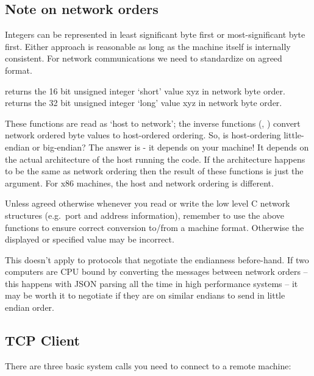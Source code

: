 \subsection{Note on network orders}

Integers can be represented in least significant byte first or most-significant byte first.
Either approach is reasonable as long as the machine itself is internally consistent.
For network communications we need to standardize on agreed format.

 returns the 16 bit unsigned integer `short' value xyz in network byte order.
 returns the 32 bit unsigned integer `long' value xyz in network byte order.

These functions are read as `host to network'; the inverse functions (, ) convert network ordered byte values to host-ordered ordering.
So, is host-ordering little-endian or big-endian? The answer is - it depends on your machine! It depends on the actual architecture of the host running the code.
If the architecture happens to be the same as network ordering then the result of these functions is just the argument.
For x86 machines, the host and network ordering is different.

Unless agreed otherwise whenever you read or write the low level C network structures (e.g.~port and address information), remember to use the above functions to ensure correct conversion to/from a machine format.
Otherwise the displayed or specified value may be incorrect.


This doesn't apply to protocols that negotiate the endianness before-hand.
If two computers are CPU bound by converting the messages between network orders -- this happens with JSON parsing all the time in high performance systems -- it may be worth it to negotiate if they are on similar endians to send in little endian order.

\subsection{TCP Client}

There are three basic system calls you need to connect to a remote machine:


